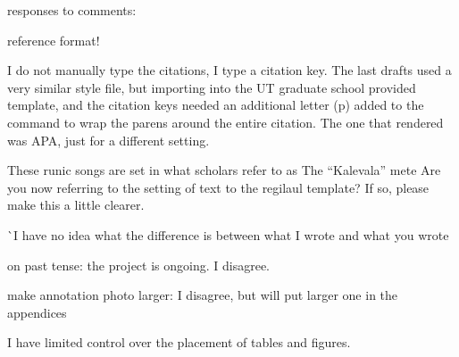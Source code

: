 responses to comments:

reference format!

I do not manually type the citations, I type a citation key. The last drafts used a very similar style file, but importing into the UT graduate school provided template, and the citation keys needed an additional letter (p) added to the command to wrap the parens around the entire citation. The one that rendered was APA, just for a different setting. 


 These runic songs are set in what scholars refer to as The “Kalevala” mete
 Are you now referring to the setting of text to the regilaul template? If so, please make this a little clearer.
 
 ^^ I have no idea what the difference is between what I wrote and what you wrote
 
 
 on past tense: the project is ongoing. I disagree. 
 
 
 make annotation photo larger: I disagree, but will put larger one in the appendices
 
 I have limited control over the placement of tables and figures. 